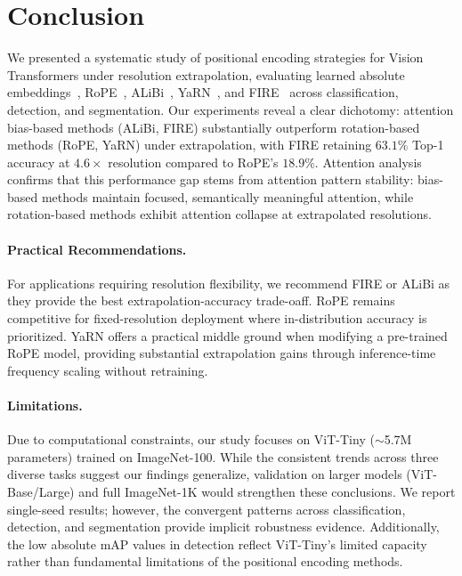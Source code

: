 \section{Conclusion}
\label{sec:conclusion}

We presented a systematic study of positional encoding strategies for Vision Transformers under
resolution extrapolation, evaluating learned absolute embeddings~\cite{dosovitskiy2021image}, RoPE~\cite{su2024roformer,heo2024rope}, ALiBi~\cite{press2022train}, YaRN~\cite{peng2024yarn}, and FIRE~\cite{li2024functional}
across classification, detection, and segmentation. Our experiments reveal a clear dichotomy:
attention bias-based methods (ALiBi, FIRE) substantially outperform rotation-based methods
(RoPE, YaRN) under extrapolation, with FIRE retaining $63.1\%$ Top-1 accuracy at $4.6\times$
resolution compared to RoPE's $18.9\%$. Attention analysis confirms that this performance gap
stems from attention pattern stability: bias-based methods maintain focused, semantically
meaningful attention, while rotation-based methods exhibit attention collapse at extrapolated
resolutions.

\paragraph{Practical Recommendations.}
For applications requiring resolution flexibility, we recommend FIRE or ALiBi as they provide
the best extrapolation-accuracy trade-oaff. RoPE remains competitive for fixed-resolution
deployment where in-distribution accuracy is prioritized. YaRN offers a practical middle ground
when modifying a pre-trained RoPE model, providing substantial extrapolation gains through
inference-time frequency scaling without retraining.

\paragraph{Limitations.}
Due to computational constraints, our study focuses on ViT-Tiny ($\sim$5.7M parameters) trained
on ImageNet-100. While the consistent trends across three diverse tasks suggest our findings
generalize, validation on larger models (ViT-Base/Large) and full ImageNet-1K would strengthen
these conclusions. We report single-seed results; however, the convergent patterns across
classification, detection, and segmentation provide implicit robustness evidence. Additionally,
the low absolute mAP values in detection reflect ViT-Tiny's limited capacity rather than
fundamental limitations of the positional encoding methods.

